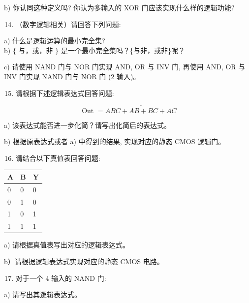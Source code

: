 \documentclass[10pt]{article}
\begin{document}
b) 你认同这种定义吗? 你认为多输入的 XOR 门应该实现什么样的逻辑功能?

\begin{enumerate}
  \setcounter{enumi}{13}
  \item （数字逻辑相关）请回答下列问题:
\end{enumerate}

a) 什么是逻辑运算的最小完全集?\\
b) $\{$ 与，或，非 $\}$ 是一个最小完全集吗？\{与非，或非\}呢？

c) 请使用 NAND 门与 NOR 门实现 AND, OR 与 INV 门, 再使用 AND, OR 与 INV 门实现 NAND 门与 NOR 门 (2 输入)。

\begin{enumerate}
  \setcounter{enumi}{14}
  \item 请根据下述逻辑表达式回答问题:
\end{enumerate}

$$
\text { Out }=\overline{A B C+\bar{A} B+B \bar{C}+A C}
$$

a) 该表达式能否进一步化简？请写出化简后的表达式。

b) 根据原表达式或者 a) 中得到的结果, 实现对应的静态 CMOS 逻辑门。

\begin{enumerate}
  \setcounter{enumi}{15}
  \item 请结合以下真值表回答问题:
\end{enumerate}

\begin{center}
\begin{tabular}{|l|l|l|}
\hline
$\boldsymbol{A}$ & $\boldsymbol{B}$ & $\boldsymbol{Y}$ \\
\hline
0 & 0 & 0 \\
\hline
0 & 1 & 0 \\
\hline
1 & 0 & 1 \\
\hline
1 & 1 & 1 \\
\hline
\end{tabular}
\end{center}

a) 请根据真值表写出对应的逻辑表达式。

b）请根据逻辑表达式实现对应的静态 $\mathrm{CMOS}$ 电路。

\begin{enumerate}
  \setcounter{enumi}{16}
  \item 对于一个 4 输入的 NAND 门:
\end{enumerate}

a) 请写出其逻辑表达式。
\end{document}
